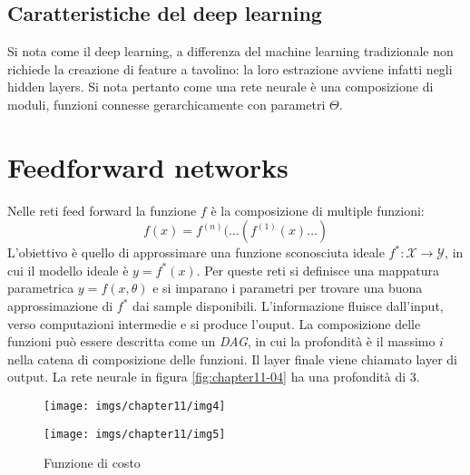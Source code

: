 	\subsection{Caratteristiche del deep learning}
	Si nota come il deep learning, a differenza del machine learning tradizionale non richiede la creazione di feature a tavolino: la loro estrazione avviene infatti negli hidden layers.
	Si nota pertanto come una rete neurale \`e una composizione di moduli, funzioni connesse gerarchicamente con parametri $\Theta$.

\section{Feedforward networks}
Nelle reti feed forward la funzione $f$ \`e la composizione di multiple funzioni:
$$f(x) = f^{(n)}(\dots(f^{(1)}(x)\dots)$$
L'obiettivo \`e quello di approssimare una funzione sconosciuta ideale $f^*:\mathcal{X}\rightarrow\mathcal{Y}$, in cui il modello ideale \`e $y = f^*(x)$.
Per queste reti si definisce una mappatura parametrica $y = f(x,\theta)$ e si imparano i parametri per trovare una buona approssimazione di $f^*$ dai sample disponibili.
L'informazione fluisce dall'input, verso computazioni intermedie e si produce l'ouput.
La composizione delle funzioni pu\`o essere descritta come un \emph{DAG}, in cui la profondit\`a \`e il massimo $i$ nella catena di composizione delle funzioni.
Il layer finale viene chiamato layer di output. 
La rete neurale in figura \ref{fig:chapter11-04} ha una profondit\`a di 3.
\begin{figure}
	\centering
	\begin{minipage}{.5\textwidth}
		\centering
		\texttt{[image: imgs/chapter11/img4]}
		\caption{}
		\label{fig:chapter11-04}
	\end{minipage}%
	\begin{minipage}{.5\textwidth}
		\centering
		\texttt{[image: imgs/chapter11/img5]}
		\caption{Funzione di costo}
		\label{fig:chapter11-05}
	\end{minipage}
\end{figure}



